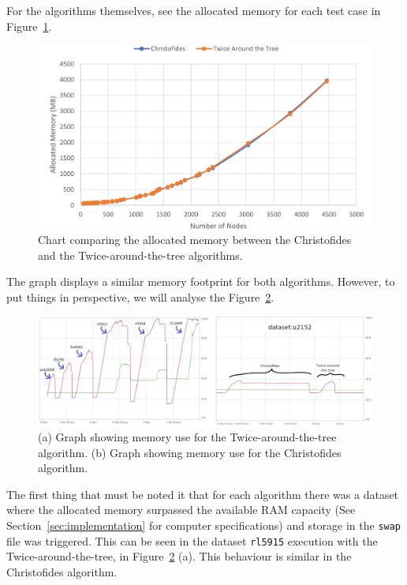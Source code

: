 \documentclass[12pt]{article}
\begin{document}
For the algorithms themselves, see the allocated memory for each test case in Figure~\ref{fig:mem_use}.

\begin{figure}[ht]
\centering
\includegraphics[height=.325\textheight]{memory_use_comparison.png}
\caption{Chart comparing the allocated memory between the Christofides and the Twice-around-the-tree algorithms.}
\label{fig:mem_use}
\end{figure}

The graph displays a similar memory footprint for both algorithms. However, to put things in perspective, 
we will analyse the Figure~\ref{fig:memory_behaviour}.

\begin{figure}[ht]
\centering
\includegraphics[height=.325\textheight]{memory_profile_comparison.png}
\caption{(a) Graph showing memory use for the Twice-around-the-tree algorithm. (b) Graph showing memory use for the Christofides algorithm.}
\label{fig:memory_behaviour}
\end{figure}

The first thing that must be noted it that for each algorithm there was a dataset where the allocated memory surpassed 
the available RAM capacity (See Section~\ref{sec:implementation} for computer specifications) and storage in the \texttt{swap}
\footnotemark file was triggered. This can be seen in the dataset \texttt{rl5915} execution with the Twice-around-the-tree, 
in Figure~\ref{fig:memory_behaviour} (a). This behaviour is similar in the Christofides algorithm.
\end{document}
